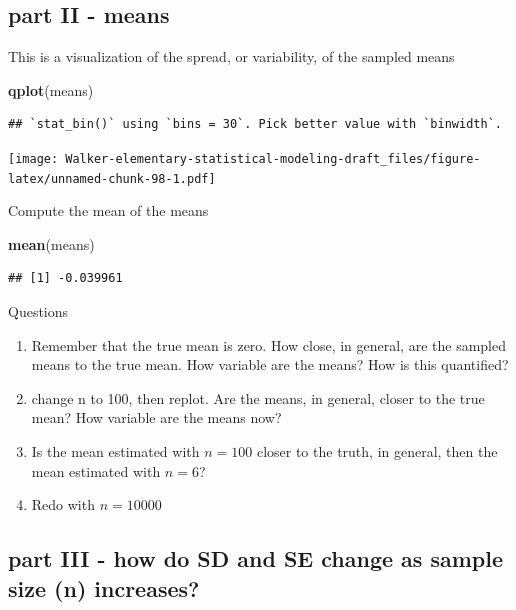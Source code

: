 \documentclass[]{book}
\newenvironment{Shaded}{\begin{snugshade}}{\end{snugshade}}
\newcommand{\KeywordTok}[1]{\textcolor[rgb]{0.13,0.29,0.53}{\textbf{#1}}}
\newcommand{\NormalTok}[1]{#1}
\providecommand{\tightlist}{%
  \setlength{\itemsep}{0pt}\setlength{\parskip}{0pt}}
\begin{document}
\hypertarget{part-ii---means}{%
\subsection{part II - means}\label{part-ii---means}}

This is a visualization of the spread, or variability, of the sampled means

\begin{Shaded}
\begin{Highlighting}[]
\KeywordTok{qplot}\NormalTok{(means)}
\end{Highlighting}
\end{Shaded}

\begin{verbatim}
## `stat_bin()` using `bins = 30`. Pick better value with `binwidth`.
\end{verbatim}

\texttt{[image: Walker-elementary-statistical-modeling-draft\_files/figure-latex/unnamed-chunk-98-1.pdf]}

Compute the mean of the means

\begin{Shaded}
\begin{Highlighting}[]
\KeywordTok{mean}\NormalTok{(means)}
\end{Highlighting}
\end{Shaded}

\begin{verbatim}
## [1] -0.039961
\end{verbatim}

Questions

\begin{enumerate}
\def\labelenumi{\arabic{enumi}.}
\tightlist
\item
  Remember that the true mean is zero. How close, in general, are the sampled means to the true mean. How variable are the means? How is this quantified?
\item
  change n to 100, then replot. Are the means, in general, closer to the true mean? How variable are the means now?
\item
  Is the mean estimated with \(n=100\) closer to the truth, in general, then the mean estimated with \(n=6\)?
\item
  Redo with \(n=10000\)
\end{enumerate}

\hypertarget{part-iii---how-do-sd-and-se-change-as-sample-size-n-increases}{%
\subsection{part III - how do SD and SE change as sample size (n) increases?}\label{part-iii---how-do-sd-and-se-change-as-sample-size-n-increases}}
\end{document}
